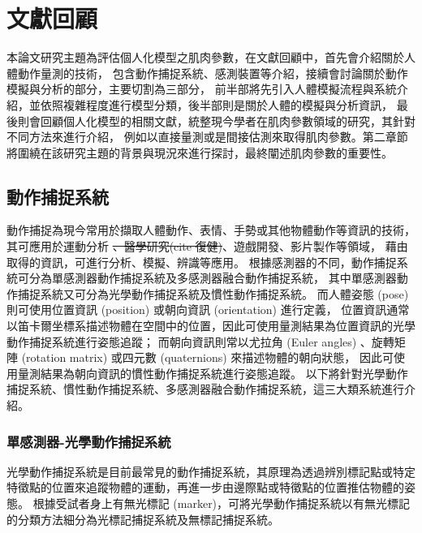 \chapter{文獻回顧}
\fontsize{12pt}{18pt}\selectfont %

本論文研究主題為評估個人化模型之肌肉參數，在文獻回顧中，首先會介紹關於人體動作量測的技術，
包含動作捕捉系統、感測裝置等介紹，接續會討論關於動作模擬與分析的部分，主要切割為三部分，
前半部將先引入人體模擬流程與系統介紹，並依照複雜程度進行模型分類，後半部則是關於人體的模擬與分析資訊，
最後則會回顧個人化模型的相關文獻，統整現今學者在肌肉參數領域的研究，其針對不同方法來進行介紹，
例如以直接量測或是間接估測來取得肌肉參數。第二章節將圍繞在該研究主題的背景與現況來進行探討，最終闡述肌肉參數的重要性。

\section{動作捕捉系統}
動作捕捉為現今常用於擷取人體動作、表情、手勢或其他物體動作等資訊的技術，其可應用於運動分析 \sout{、醫學研究(cite 復健)}、遊戲開發、影片製作等領域，
藉由取得的資訊，可進行分析、模擬、辨識等應用。
根據感測器的不同，動作捕捉系統可分為單感測器動作捕捉系統及多感測器融合動作捕捉系統，
其中單感測器動作捕捉系統又可分為光學動作捕捉系統及慣性動作捕捉系統。
而人體姿態 (pose) 則可使用位置資訊 (position) 或朝向資訊 (orientation) 進行定義，
位置資訊通常以笛卡爾坐標系描述物體在空間中的位置，因此可使用量測結果為位置資訊的光學動作捕捉系統進行姿態追蹤；
而朝向資訊則常以尤拉角 (Euler angles) 、旋轉矩陣 (rotation matrix) 或四元數 (quaternions) 來描述物體的朝向狀態，
因此可使用量測結果為朝向資訊的慣性動作捕捉系統進行姿態追蹤。
以下將針對光學動作捕捉系統、慣性動作捕捉系統、多感測器融合動作捕捉系統，這三大類系統進行介紹。

\subsection{單感測器-光學動作捕捉系統}
光學動作捕捉系統是目前最常見的動作捕捉系統，其原理為透過辨別標記點或特定特徵點的位置來追蹤物體的運動，再進一步由邊際點或特徵點的位置推估物體的姿態。
根據受試者身上有無光標記 (marker)，可將光學動作捕捉系統以有無光標記的分類方法細分為光標記捕捉系統及無標記捕捉系統。

